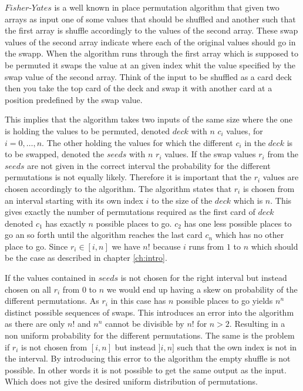$Fisher\text{-}Yates$ is a well known in place permutation algorithm that given two arrays as input one of some values that should be shuffled and another such that the first array is shuffle accordingly to the values of the second array. These swap values of the second array indicate where each of the original values should go in the swapp. When the algorithm runs through the first array which is supposed to be permuted it swaps the value at an given index whit the value specified by the swap value of the second array. Think of the input to be shuffled as a card deck then you take the top card of the deck and swap it with another card at a position predefined by the swap value.

This implies that the algorithm takes two inputs of the same size where the one is holding the values to be permuted, denoted $deck$ with $n$ $c_i$ values, for $i=0,\dots,n$. The other holding the values for which the different $c_i$ in the $deck$ is to be swapped, denoted the $seeds$ with $n$ $r_i$ values. If the swap values $r_i$ from the $seeds$ are not given in the correct interval the probability for the different permutations is not equally likely. Therefore it is important that the $r_i$ values are chosen accordingly to the algorithm. The algorithm states that $r_i$ is chosen from an interval starting with its own index $i$ to the size of the $deck$ which is $n$. This gives exactly the number of permutations required as the first card of $deck$ denoted $c_1$ has exactly $n$ possible places to go. $c_2$ has one less possible places to go an so forth until the algorithm reaches the last card $c_n$ which has no other place to go. Since $r_i\in[i,n]$ we have $n!$ because $i$ runs from $1$ to $n$ which should be the case as described in chapter \ref{ch:intro}.

If the values contained in $seeds$ is not chosen for the right interval but instead chosen on all $r_i$ from $0$ to $n$ we would end up having a skew on probability of the different permutations. As $r_i$ in this case has $n$ possible places to go yields $n^n$ distinct possible sequences of swaps. This introduces an error into the algorithm as there are only $n!$ and $n^n$ cannot be divisible by $n!$ for $n>2$. Resulting in a non uniform probability for the different permutations. The same is the problem if $r_i$ is not chosen from $[i,n]$ but instead $]i,n]$ such that the own index is not in the interval. By introducing this error to the algorithm the empty shuffle is not possible. In other words it is not possible to get the same output as the input. Which does not give the desired uniform distribution of permutations.

